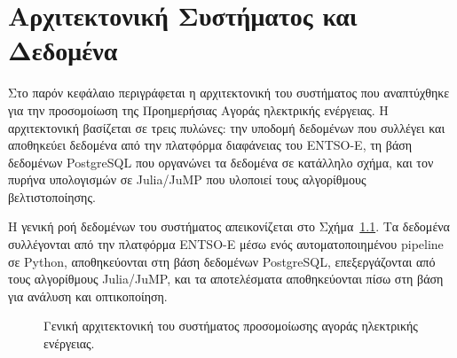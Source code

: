% 

\chapter{Αρχιτεκτονική Συστήματος και Δεδομένα}
\label{ch:system-architecture}

Στο παρόν κεφάλαιο περιγράφεται η αρχιτεκτονική του συστήματος που αναπτύχθηκε για την προσομοίωση της Προημερήσιας Αγοράς ηλεκτρικής ενέργειας. Η αρχιτεκτονική βασίζεται σε τρεις πυλώνες: την υποδομή δεδομένων που συλλέγει και αποθηκεύει δεδομένα από την πλατφόρμα διαφάνειας του ENTSO-E, τη βάση δεδομένων PostgreSQL που οργανώνει τα δεδομένα σε κατάλληλο σχήμα, και τον πυρήνα υπολογισμών σε Julia/JuMP που υλοποιεί τους αλγορίθμους βελτιστοποίησης.

Η γενική ροή δεδομένων του συστήματος απεικονίζεται στο Σχήμα~\ref{fig:system-architecture}. Τα δεδομένα συλλέγονται από την πλατφόρμα ENTSO-E μέσω ενός αυτοματοποιημένου pipeline σε Python, αποθηκεύονται στη βάση δεδομένων PostgreSQL, επεξεργάζονται από τους αλγορίθμους Julia/JuMP, και τα αποτελέσματα αποθηκεύονται πίσω στη βάση για ανάλυση και οπτικοποίηση.

\begin{figure}[htbp]
\centering
\caption{Γενική αρχιτεκτονική του συστήματος προσομοίωσης αγοράς ηλεκτρικής ενέργειας.}
\label{fig:system-architecture}
\end{figure}


